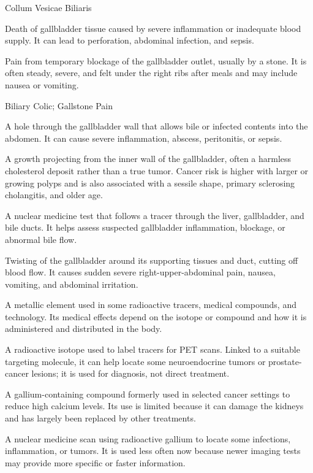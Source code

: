 \synonyms
Collum Vesicae Biliaris

 Death of gallbladder tissue caused by severe inflammation or inadequate blood supply. It can lead to perforation, abdominal infection, and sepsis.

 Pain from temporary blockage of the gallbladder outlet, usually by a stone. It is often steady, severe, and felt under the right ribs after meals and may include nausea or vomiting.

\synonyms
Biliary Colic; Gallstone Pain

 A hole through the gallbladder wall that allows bile or infected contents into the abdomen. It can cause severe inflammation, abscess, peritonitis, or sepsis.

 A growth projecting from the inner wall of the gallbladder, often a harmless cholesterol deposit rather than a true tumor. Cancer risk is higher with larger or growing polyps and is also associated with a sessile shape, primary sclerosing cholangitis, and older age.

 A nuclear medicine test that follows a tracer through the liver, gallbladder, and bile ducts. It helps assess suspected gallbladder inflammation, blockage, or abnormal bile flow.

 Twisting of the gallbladder around its supporting tissues and duct, cutting off blood flow. It causes sudden severe right-upper-abdominal pain, nausea, vomiting, and abdominal irritation.

 A metallic element used in some radioactive tracers, medical compounds, and technology. Its medical effects depend on the isotope or compound and how it is administered and distributed in the body.

 A radioactive isotope used to label tracers for PET scans. Linked to a suitable targeting molecule, it can help locate some neuroendocrine tumors or prostate-cancer lesions; it is used for diagnosis, not direct treatment.

 A gallium-containing compound formerly used in selected cancer settings to reduce high calcium levels. Its use is limited because it can damage the kidneys and has largely been replaced by other treatments.

 A nuclear medicine scan using radioactive gallium to locate some infections, inflammation, or tumors. It is used less often now because newer imaging tests may provide more specific or faster information.

